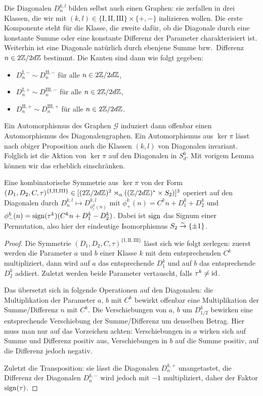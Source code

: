 Die Diagonalen $D_n^{k,l}$ bilden selbst auch einen Graphen: sie zerfallen in drei Klassen, die wir mit $(k,l) \in \{\mathrm{I}, \mathrm{II}, \mathrm{III}\} \times \{+,-\}$ indizieren wollen. Die erste Komponente steht für die Klasse, die zweite dafür, ob die Diagonale durch eine konstante Summe oder eine konstante Differenz der Parameter charakterisiert ist. Weiterhin ist eine Diagonale natürlich durch ebenjene Summe bzw.~Differenz $n \in 2\Zmod 2dZ$ bestimmt. Die Kanten sind dann wie folgt gegeben:
\begin{itemize}
\item $D_n^{\mathrm{I},-} \sim D_n^{\mathrm{II},-}$ für alle $n \in 2\Zmod 2dZ$,
\item $D_n^{\mathrm{I},+} \sim D_n^{\mathrm{III},-}$ für alle $n \in 2\Zmod 2dZ$,
\item $D_n^{\mathrm{II},+} \sim D_n^{\mathrm{III},+}$ für alle $n \in 2\Zmod 2dZ$.
\end{itemize}
Ein Automorphismus des Graphen $\mathcal G$ induziert dann offenbar einen Automorphismus des Diagonalengraphen. Ein Automorphismus aus $\ker \pi$ lässt nach obiger Proposition auch die Klassen $(k,l)$ von Diagonalen invariant. Folglich ist die Aktion von $\ker \pi$ auf den Diagonalen in $S_d^6$. Mit vorigem Lemma können wir das erheblich einschränken.

\begin{lemma}
Eine kombinatorische Symmetrie aus $\ker \pi$ von der Form $(D_1, D_2, C, \tau)^{\{\mathrm{I, II, III}\}} \in [(2\Zmod 2dZ)^2 \rtimes_\alpha ((\Zmod 2dZ)^* \times S_2)]^3$ operiert auf den Diagonalen durch $D_n^{k,l} \mapsto D_{\phi_l^k(n)}^{k,l}$ mit $\phi_+^k(n) = C^k n + D_1^k + D_2^k$ und $\phi_-^k(n) = \operatorname{sign}(\tau^k)(C^k n + D_1^k - D_2^k)$. Dabei ist $\operatorname{sign}$ das Signum einer Permutation, also hier der eindeutige Isomorphismus $S_2 \overrel\to^\sim \{\pm 1\}$.
\end{lemma}
\begin{proof}
Die Symmetrie $(D_1, D_2, C, \tau)^{\{\mathrm{I, II, III}\}}$ lässt sich wie folgt zerlegen: zuerst werden die Parameter $a$ und $b$ einer Klasse $k$ mit dem entsprechenden $C^k$ multipliziert, dann wird auf $a$ das entsprechende $D_1^k$ und auf $b$ das entsprechende $D_2^k$ addiert. Zuletzt werden beide Parameter vertauscht, falls $\tau^k \neq \operatorname{id}$.

Das übersetzt sich in folgende Operationen auf den Diagonalen: die Multiplikation der Parameter $a$, $b$ mit $C^k$ bewirkt offenbar eine Multiplikation der Summe/Differenz $n$ mit $C^k$. Die Verschiebungen von $a$, $b$ um $D_{1/2}^k$ bewirken eine entsprechende Verschiebung der Summe/Differenz um denselben Betrag. Hier muss man nur auf das Vorzeichen achten: Verschiebungen in $a$ wirken sich auf Summe und Differenz positiv aus, Verschiebungen in $b$ auf die Summe positiv, auf die Differenz jedoch negativ.

Zuletzt die Transposition: sie lässt die Diagonalen $D_n^{k,+}$ unangetastet, die Differenz der Diagonalen $D_n^{k,-}$ wird jedoch mit $-1$ multipliziert, daher der Faktor $\operatorname{sign}(\tau)$.
\end{proof}

